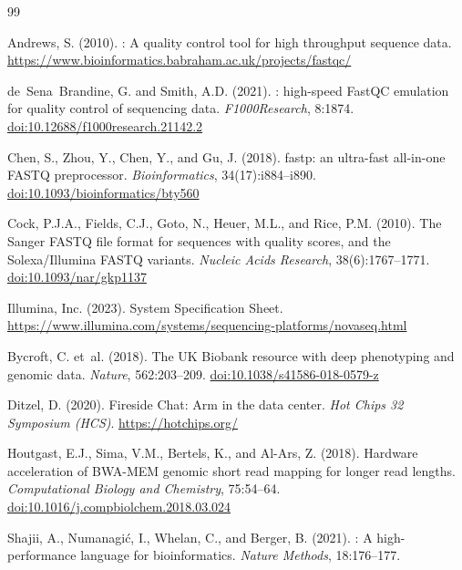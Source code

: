 \documentclass[a4paper,12pt]{article}
\newcommand{\doi}[1]{\href{https://doi.org/#1}{doi:{#1}}}
\begin{document}
\newpage
\begin{thebibliography}{99}

Andrews, S. (2010).
: A quality control tool for high throughput sequence data.
\newblock \url{https://www.bioinformatics.babraham.ac.uk/projects/fastqc/}

de~Sena~Brandine, G. and Smith, A.D. (2021).
: high-speed {FastQC} emulation for quality control of
  sequencing data.
\newblock \textit{F1000Research}, 8:1874.
\newblock \doi{10.12688/f1000research.21142.2}

Chen, S., Zhou, Y., Chen, Y., and Gu, J. (2018).
\newblock fastp: an ultra-fast all-in-one {FASTQ} preprocessor.
\newblock \textit{Bioinformatics}, 34(17):i884--i890.
\newblock \doi{10.1093/bioinformatics/bty560}

Cock, P.J.A., Fields, C.J., Goto, N., Heuer, M.L., and Rice, P.M. (2010).
\newblock The {Sanger} {FASTQ} file format for sequences with quality scores,
  and the {Solexa/Illumina} {FASTQ} variants.
\newblock \textit{Nucleic Acids Research}, 38(6):1767--1771.
\newblock \doi{10.1093/nar/gkp1137}

Illumina, Inc. (2023).
 System Specification Sheet.
\newblock \url{https://www.illumina.com/systems/sequencing-platforms/novaseq.html}

Bycroft, C. et~al. (2018).
\newblock The {UK Biobank} resource with deep phenotyping and genomic data.
\newblock \textit{Nature}, 562:203--209.
\newblock \doi{10.1038/s41586-018-0579-z}

Ditzel, D. (2020).
\newblock Fireside Chat: {Arm} in the data center.
\newblock \textit{Hot Chips 32 Symposium (HCS)}.
\newblock \url{https://hotchips.org/}

Houtgast, E.J., Sima, V.M., Bertels, K., and Al-Ars, Z. (2018).
\newblock Hardware acceleration of {BWA-MEM} genomic short read mapping for
  longer read lengths.
\newblock \textit{Computational Biology and Chemistry}, 75:54--64.
\newblock \doi{10.1016/j.compbiolchem.2018.03.024}

Shajii, A., Numanagi\'{c}, I., Whelan, C., and Berger, B. (2021).
: A high-performance language for bioinformatics.
\newblock \textit{Nature Methods}, 18:176--177.


\end{thebibliography}
\end{document}
